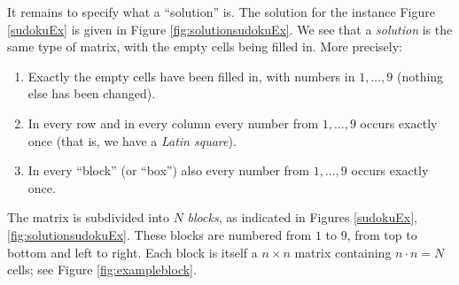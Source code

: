 \documentclass[11pt]{report}
\begin{document}
It remains to specify what a ``solution'' is. The solution for the instance Figure \ref{sudokuEx} is given in Figure \ref{fig:solutionsudokuEx}. We see that a \textit{solution} is the same type of matrix, with the empty cells being filled in. More precisely:
\begin{enumerate}
\item Exactly the empty cells have been filled in, with numbers in $1,\dots,9$ (nothing else has been changed).
\item In every row and in every column every number from $1,\dots,9$ occurs exactly once (that is, we have a \emph{Latin square}).
\item In every ``block'' (or ``box'') also every number from $1,\dots,9$ occurs exactly once.
\end{enumerate}

The matrix is subdivided into $N$ \textit{blocks}, as indicated in Figures \ref{sudokuEx}, \ref{fig:solutionsudokuEx}. These blocks are numbered from $1$ to $9$, from top to bottom and left to right. Each block is itself a $n \times n$ matrix containing $n \cdot n = N$ cells; see Figure \ref{fig:exampleblock}.
\end{document}
